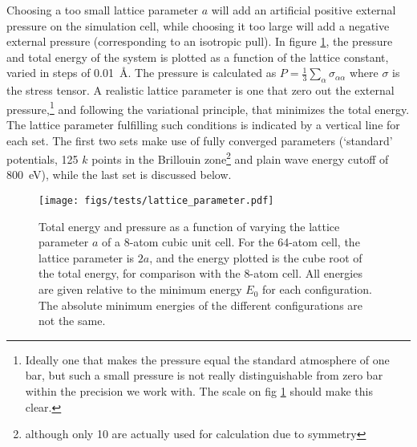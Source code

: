 \documentclass[11pt,bibliography=totoc,index=totoc]{scrbook}   %
\begin{document}
Choosing a too small lattice parameter $a$ will add an artificial positive external pressure on the simulation cell, while choosing it too large
will add a negative external pressure (corresponding to an isotropic pull).
In figure \ref{fig:si_bulk_conv_vol}, the pressure and total energy of the system is plotted as a function of the lattice constant, varied in steps of 0.01~Å. 
The pressure is calculated as $P=\frac{1}{3}\sum_{\alpha} \sigma_{\alpha\alpha}$ where $\sigma$ is the stress tensor.
A realistic lattice parameter is one that zero out the external pressure,\footnote{Ideally one that makes the pressure equal the standard atmosphere of one bar, but such a small pressure is not really distinguishable from zero bar within the precision we work with. The scale on fig \ref{fig:si_bulk_conv_vol} should make this clear.} and following the variational principle, that minimizes the total energy. 
The lattice parameter fulfilling such conditions is indicated by a vertical line for each set.
The first two sets make use of fully converged parameters (`standard' potentials, 125 $k$ points in the Brillouin zone\footnote{although only 10 are actually used for calculation due to symmetry} and plain wave energy cutoff of 800~eV), while the last set is discussed below.


\begin{figure}[htbp]
  \begin{center}
    \texttt{[image: figs/tests/lattice\_parameter.pdf]}
  \end{center}
  \caption{
     Total energy and pressure as a function of varying the lattice parameter $a$ of a 8-atom cubic unit cell.
     For the 64-atom cell, the lattice parameter is $2a$, and the energy plotted is the cube root of the total energy, 
     for comparison with the 8-atom cell. 
     All energies are given relative to the minimum energy $E_0$ for each configuration.
     The absolute minimum energies of the different configurations are not the same.
  }
  \label{fig:si_bulk_conv_vol}
\end{figure}
\end{document}
